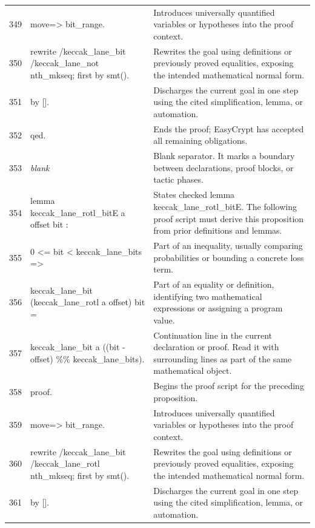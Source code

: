 \documentclass[10pt]{article}
\begin{document}
\begin{longtable}{r L{0.53\textwidth} L{0.37\textwidth}}
349 & {\ttfamily\scriptsize move=> bit\_range.} & Introduces universally quantified variables or hypotheses into the proof context. \\
350 & {\ttfamily\scriptsize rewrite /keccak\_lane\_bit /keccak\_lane\_not nth\_mkseq; first by smt().} & Rewrites the goal using definitions or previously proved equalities, exposing the intended mathematical normal form. \\
351 & {\ttfamily\scriptsize by [].} & Discharges the current goal in one step using the cited simplification, lemma, or automation. \\
352 & {\ttfamily\scriptsize qed.} & Ends the proof; EasyCrypt has accepted all remaining obligations. \\
353 & {\ttfamily\scriptsize \emph{blank}} & Blank separator.  It marks a boundary between declarations, proof blocks, or tactic phases. \\
354 & {\ttfamily\scriptsize lemma keccak\_lane\_rotl\_bitE a offset bit :} & States checked lemma keccak\_lane\_rotl\_bitE.  The following proof script must derive this proposition from prior definitions and lemmas. \\
355 & {\ttfamily\scriptsize   0 <= bit < keccak\_lane\_bits =>} & Part of an inequality, usually comparing probabilities or bounding a concrete loss term. \\
356 & {\ttfamily\scriptsize   keccak\_lane\_bit (keccak\_lane\_rotl a offset) bit =} & Part of an equality or definition, identifying two mathematical expressions or assigning a program value. \\
357 & {\ttfamily\scriptsize   keccak\_lane\_bit a ((bit - offset) \%\% keccak\_lane\_bits).} & Continuation line in the current declaration or proof.  Read it with surrounding lines as part of the same mathematical object. \\
358 & {\ttfamily\scriptsize proof.} & Begins the proof script for the preceding proposition. \\
359 & {\ttfamily\scriptsize move=> bit\_range.} & Introduces universally quantified variables or hypotheses into the proof context. \\
360 & {\ttfamily\scriptsize rewrite /keccak\_lane\_bit /keccak\_lane\_rotl nth\_mkseq; first by smt().} & Rewrites the goal using definitions or previously proved equalities, exposing the intended mathematical normal form. \\
361 & {\ttfamily\scriptsize by [].} & Discharges the current goal in one step using the cited simplification, lemma, or automation. \\

\end{longtable}
\end{document}
